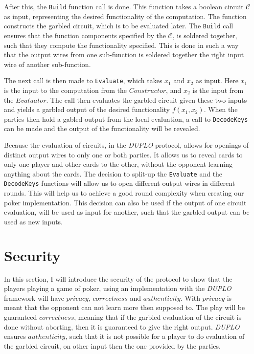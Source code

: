 \documentclass[twoside,11pt,openright]{report}
\newcommand{\DUPLO}{\textit{DUPLO} }
\begin{document}
After this, the \verb|Build| function call is done. This function takes a boolean circuit $\mathcal{C}$ as input, representing the desired functionality of the computation. The function constructs the garbled circuit, which is to be evaluated later. The \verb|Build| call ensures that the function components specified by the $\mathcal{C}$, is soldered together, such that they compute the functionality specified. This is done in such a way that the output wires from one sub-function is soldered together the right input wire of another sub-function. 

The next call is then made to \verb|Evaluate|, which takes $x_1$ and $x_2$ as input. Here $x_1$ is the input to the computation from the $Constructor$, and $x_2$ is the input from the $Evaluator$. The call then  evaluates the garbled circuit given these two inputs and yields a garbled output of the desired functionality $f(x_1,x_2)$. When the parties then hold a gabled output from the local evaluation, a call to \verb|DecodeKeys| can be made and the output of the functionality will be revealed.

\bigskip

Because the evaluation of circuits, in the \DUPLO protocol, allows for openings of distinct output wires to only one or both parties. It allows us to reveal cards to only one player and other cards to the other, without the opponent learning anything about the cards. The decision to split-up the \verb|Evaluate| and the \verb|DecodeKeys| functions will allow us to open different output wires in different rounds. This will help us to achieve a good round complexity when creating our poker implementation. This decision can also be used if the output of one circuit evaluation, will be used as input for another, such that the garbled output can be used as new inputs.


\section{Security}
\label{sec:duplo_secutity}
In this section, I will introduce the security of the protocol to show that the players playing a game of poker, using an implementation with the \DUPLO framework will have $privacy$, $correctness$ and $authenticity$. With $privacy$ is meant that the opponent can not learn more then supposed to. The play will be guaranteed $correctness$, meaning that if the garbled evaluation of the circuit is done without aborting, then it is guaranteed to give the right output. \DUPLO ensures $authenticity$, such that it is not possible for a player to do evaluation of the garbled circuit, on other input then the one provided by the parties.
\end{document}
